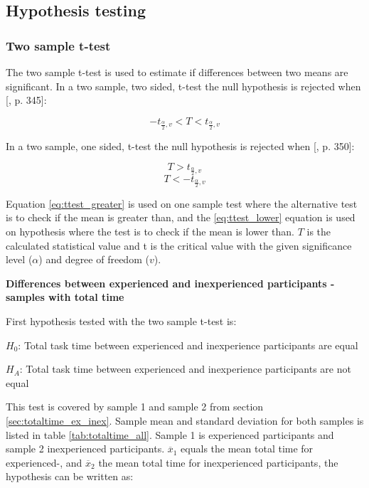 \subsection{Hypothesis testing}\label{sec:hypothesis_results}

\subsubsection{Two sample t-test}\label{sec:t-test_result}

The two sample t-test is used to estimate if differences between two means are significant. In a two sample, two sided, t-test the null hypothesis is rejected when [\citep{Walpole2012}, p. 345]:

\begin{equation}
\label{eq:ttest_twoway}
-t_{\frac{\alpha}{2}, v} < T < t_{\frac{\alpha}{2}, v}
\end{equation}

In a two sample, one sided, t-test the null hypothesis is rejected when [\citep{Walpole2012}, p. 350]:

\begin{equation}
\label{eq:ttest_greater}
T > t_{\frac{\alpha}{2}, v}
\end{equation}
\begin{equation}
\label{eq:ttest_lower}
T < - t_{\frac{\alpha}{2}, v}
\end{equation}

Equation \ref{eq:ttest_greater} is used on one sample test where the alternative test is to check if the mean is greater than, and the \ref{eq:ttest_lower} equation is used on hypothesis where the test is to check if the mean is lower than. $T$ is the calculated statistical value and t is the critical value with the given significance level ($\alpha$) and degree of freedom ($v$). \newline 

\textbf{Differences between experienced and inexperienced participants - samples with total time}\newline

First hypothesis tested with the two sample t-test is: \\
\centerline{$H_{0}$: Total task time between experienced and inexperience participants are equal} 
\centerline{$H_{A}$: Total task time between experienced and inexperience participants are not equal}

This test is covered by sample 1 and sample 2 from section \ref{sec:totaltime_ex_inex}. Sample mean and standard deviation for both samples is listed in table \ref{tab:totaltime_all}. Sample 1 is experienced participants and sample 2 inexperienced participants. $\overline{x}_1$ equals the mean total time for experienced-, and $\overline{x}_2$ the mean total time for inexperienced participants, the hypothesis can be written as:

